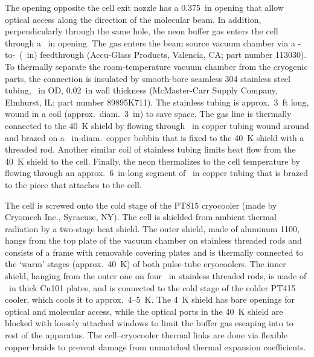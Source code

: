 The opening opposite the cell exit nozzle has a 0.375~in opening that allow
optical access along the direction of the molecular beam. In addition,
perpendicularly through the same hole, the neon buffer gas enters the cell
through a ~in opening. The gas enters the beam source vacuum
chamber via a \KF{}-to-\VCR\ (~in) feedthrough
(Accu-Glass Products, Valencia, CA; part number 113030). To thermally separate
the room-temperature vacuum chamber from the cryogenic parts, the connection is
insulated by smooth-bore seamless 304 stainless steel tubing, ~in
OD, 0.02~in wall thickness (McMaster-Carr Supply Company, Elmhurst, IL; part
number 89895K711). The stainless tubing is approx.\ 3~ft long, wound in a coil
(approx.\ diam.\ 3~in) to save space. The gas line is thermally connected to the
40~K shield by flowing through ~in copper tubing wound around and
brazed on a ~in-diam.\ copper bobbin that is fixed to the 40~K
shield with a threaded rod. Another similar coil of stainless tubing limits heat
flow from the 40~K shield to the cell. Finally, the neon thermalizes to the cell
temperature by flowing through an approx.\ 6~in-long segment of
~in copper tubing that is brazed to the piece that attaches to
the cell.

The cell is screwed onto the cold stage of the PT815 cryocooler (made by
Cryomech Inc., Syracuse, NY). The cell is shielded from ambient thermal
radiation by a two-stage heat shield. The outer shield, made of aluminum 1100,
hangs from the top plate of the vacuum chamber on stainless threaded rods and
consists of a frame with removable covering plates and is thermally connected to
the `warm' stages (approx.\ 40~K) of both pulse-tube cryocoolers. The inner
shield, hanging from the outer one on four ~in stainless threaded
rods, is made of ~in thick Cu101 plates, and is connected to the
cold stage of the colder PT415 cooler, which cools it to approx.\ 4--5~K. The 4~K
shield has bare openings for optical and molecular access, while the optical
ports in the 40~K shield are blocked with loosely attached windows to limit the
buffer gas escaping into to rest of the apparatus. The cell--cryocooler thermal
links are done via flexible copper braids to prevent damage from unmatched
thermal expansion coefficients.

